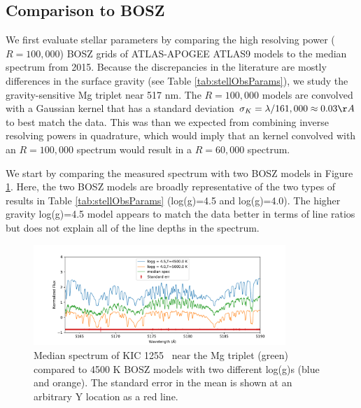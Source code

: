 \documentclass[preprint,trackchanges]{aastex61}
\newcommand{\shStar}{KIC 1255}
\begin{document}
\subsection{Comparison to BOSZ}
We first evaluate stellar parameters by comparing the high resolving power ($R=100,000$) BOSZ grids of ATLAS-APOGEE ATLAS9 models \citep{bohlin2017bosz} to the median spectrum from 2015.
Because the discrepancies in the literature are mostly differences in the surface gravity (see Table \ref{tab:stellObsParams}), we study the gravity-sensitive Mg triplet near 517 nm.
The $R=100,000$ models are convolved with a Gaussian kernel that has a standard deviation $\sigma_K = \lambda/161,000 \approx 0.03 \AA$ to best match the data.
This was  than we expected from combining inverse resolving powers in quadrature, which would imply that an  kernel  convolved with an $R=100,000$ spectrum would result in a $R=60,000$ spectrum.

We start by comparing the measured spectrum with two BOSZ models in Figure \ref{fig:mgTripletBOSZ}.
Here, the two BOSZ models are broadly representative of the two types of results in Table \ref{tab:stellObsParams} (log(g)=4.5 and log(g)=4.0).
The higher gravity log(g)=4.5 model appears to match the data better in terms of line ratios but does not explain all of the line depths in the spectrum.

\begin{figure}[!hbtp]
\begin{centering}
\includegraphics[width=0.85\textwidth]{bosz_mg_triplet_median_spec_w_5000.pdf}
\caption{Median spectrum of \shStar\ \citep{masuda2018rvKIC1255} near the Mg triplet (green) compared to 4500 K BOSZ models with two different log(g)s (blue and orange). The standard error in the mean is shown at an arbitrary Y location as a red line.}\label{fig:mgTripletBOSZ}
\end{centering}
\end{figure}
\end{document}
